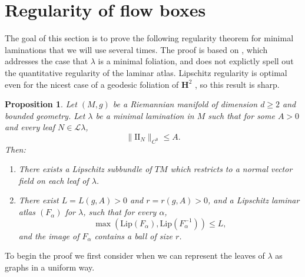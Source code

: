 \documentclass[reqno,11pt]{amsart}
\newcommand{\Hyp}{\mathbf H}
\newcommand{\Leaves}{\mathscr L}
\newcommand{\Two}{\mathrm{I\!I}}
\newcommand{\Lip}{\mathrm{Lip}}
\newtheorem{proposition}[theorem]{Proposition}
\theoremstyle{definition}
\numberwithin{equation}{section}
\begin{document}
\section{Regularity of flow boxes}\label{Regularity}
The goal of this section is to prove the following regularity theorem for minimal laminations that we will use several times.
The proof is based on \cite[Theorem 1.1]{Solomon86}, which addresses the case that $\lambda$ is a minimal foliation, and does not explictly spell out the quantitative regularity of the laminar atlas.
Lipschitz regularity is optimal even for the nicest case of a geodesic foliation of $\Hyp^2$ \cite[\S1]{Solomon86}, so this result is sharp.

\begin{proposition}\label{regularity theorem}
Let $(M, g)$ be a Riemannian manifold of dimension $d \geq 2$ and bounded geometry.
Let $\lambda$ be a minimal lamination in $M$ such that for some $A > 0$ and every leaf $N \in \Leaves \lambda$,
\begin{equation}\label{curvature bound in regularity}
	\|\Two_N\|_{C^0} \leq A.
\end{equation}
Then:
\begin{enumerate}
\item There exists a Lipschitz subbundle of $TM$ which restricts to a normal vector field on each leaf of $\lambda$.
\item There exist $L = L(g, A) > 0$ and $r = r(g, A) > 0$, and a Lipschitz laminar atlas $(F_\alpha)$ for $\lambda$, such that for every $\alpha$,
\begin{equation}\label{conorm of flow box}
	\max(\Lip(F_\alpha), \Lip(F_\alpha^{-1})) \leq L,
\end{equation}
and the image of $F_\alpha$ contains a ball of size $r$.
\end{enumerate}
\end{proposition}

To begin the proof we first consider when we can represent the leaves of $\lambda$ as graphs in a uniform way.
\end{document}
